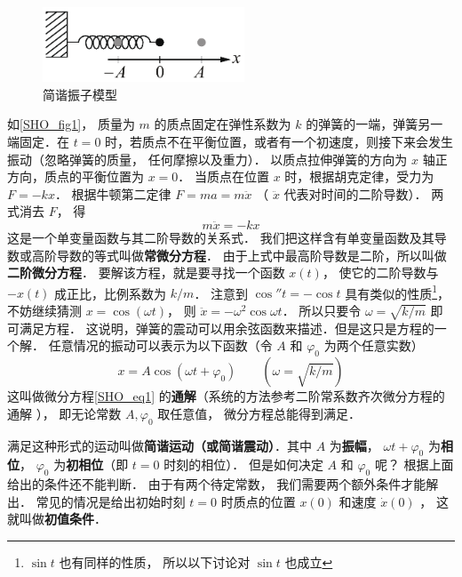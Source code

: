 

\begin{figure}[ht]
\centering
\includegraphics[width=6cm]{./figures/SHO.pdf}
\caption{简谐振子模型} \label{SHO_fig1}
\end{figure}

如\autoref{SHO_fig1}， 质量为 $m$ 的质点固定在弹性系数为 $k$ 的弹簧的一端，弹簧另一端固定．在 $t = 0$ 时，若质点不在平衡位置，或者有一个初速度，则接下来会发生振动（忽略弹簧的质量， 任何摩擦以及重力）． 以质点拉伸弹簧的方向为 $x$ 轴正方向，质点的平衡位置为 $x = 0$． 当质点在位置 $x$ 时，根据胡克定律，受力为 $F =  - kx$． 根据牛顿第二定律 $F = ma = m\ddot x$ （ $\ddot x$ 代表对时间的二阶导数）．  两式消去 $F$， 得
\begin{equation}\label{SHO_eq1}
m\ddot x =  - kx
\end{equation}
这是一个单变量函数与其二阶导数的关系式． 我们把这样含有单变量函数及其导数或高阶导数的等式叫做\textbf{常微分方程}． 由于上式中最高阶导数是二阶，所以叫做\textbf{二阶微分方程}． 要解该方程，就是要寻找一个函数 $x(t)$， 使它的二阶导数与 $- x(t)$ 成正比，比例系数为 $k/m$． 注意到 $\cos'' t =  - \cos t$ 具有类似的性质\footnote{$\sin t$ 也有同样的性质， 所以以下讨论对 $\sin t$ 也成立}，不妨继续猜测 $x = \cos(\omega t)$， 则 $\ddot x =  - {\omega ^2}\cos \omega t$． 所以只要令 $\omega = \sqrt {{k}/{m}}$ 即可满足方程． 这说明，弹簧的震动可以用余弦函数来描述．但是这只是方程的一个解． 任意情况的振动可以表示为以下函数（令 $A$ 和 $\varphi_0$ 为两个任意实数）
\begin{equation}\label{SHO_eq2}
x = A\cos \left( {\omega t + {\varphi _0}} \right)  \qquad (\omega  = \sqrt {k/m})
\end{equation}
这叫做微分方程\autoref{SHO_eq1} 的\textbf{通解}（系统的方法参考二阶常系数齐次微分方程的通解
）， 即无论常数 $A, \varphi_0$ 取任意值， 微分方程总能得到满足．

满足这种形式的运动叫做\textbf{简谐运动（或简谐震动）}．其中 $A$ 为\textbf{振幅}， $\omega t + {\varphi _0}$ 为\textbf{相位}， ${\varphi _0}$ 为\textbf{初相位}（即 $t = 0$ 时刻的相位）． 但是如何决定 $A$ 和 ${\varphi _0}$ 呢？ 根据上面给出的条件还不能判断． 由于有两个待定常数， 我们需要两个额外条件才能解出． 常见的情况是给出初始时刻 $t = 0$ 时质点的位置 $x(0)$ 和速度 $\dot x(0)$ ， 这就叫做\textbf{初值条件}．

